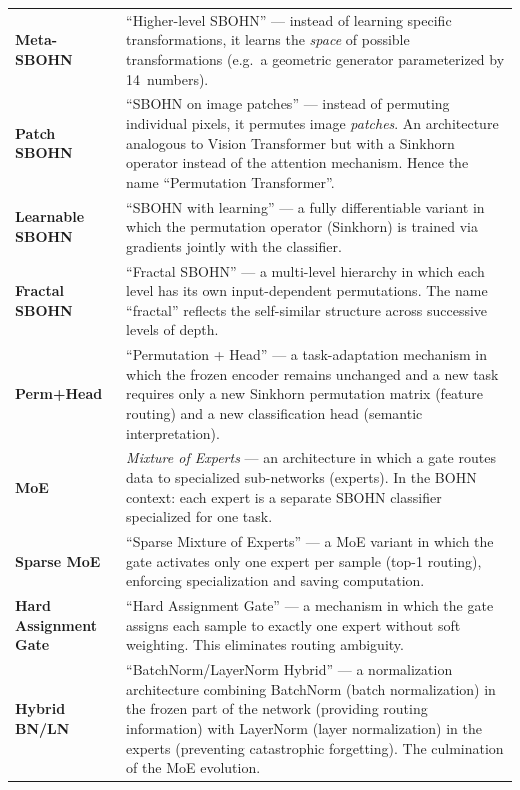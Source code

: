 \documentclass[11pt,a4paper]{report}
\begin{document}
\begin{center}
\begin{tabular}{lp{10cm}}
\textbf{Meta-SBOHN} &
``Higher-level SBOHN'' --- instead of learning specific transformations, it learns the \emph{space} of possible transformations (e.g.\ a geometric generator parameterized by 14~numbers). \\

\textbf{Patch SBOHN} &
``SBOHN on image patches'' --- instead of permuting individual pixels, it permutes image \emph{patches}. An architecture analogous to Vision Transformer but with a Sinkhorn operator instead of the attention mechanism. Hence the name ``Permutation Transformer''. \\

\textbf{Learnable SBOHN} &
``SBOHN with learning'' --- a fully differentiable variant in which the permutation operator (Sinkhorn) is trained via gradients jointly with the classifier. \\

\textbf{Fractal SBOHN} &
``Fractal SBOHN'' --- a multi-level hierarchy in which each level has its own input-dependent permutations. The name ``fractal'' reflects the self-similar structure across successive levels of depth. \\

\textbf{Perm+Head} &
``Permutation + Head'' --- a task-adaptation mechanism in which the frozen encoder remains unchanged and a new task requires only a new Sinkhorn permutation matrix (feature routing) and a new classification head (semantic interpretation). \\

\textbf{MoE} &
\emph{Mixture of Experts} --- an architecture in which a gate routes data to specialized sub-networks (experts). In the BOHN context: each expert is a separate SBOHN classifier specialized for one task. \\

\textbf{Sparse MoE} &
``Sparse Mixture of Experts'' --- a MoE variant in which the gate activates only one expert per sample (top-1 routing), enforcing specialization and saving computation. \\

\textbf{Hard Assignment Gate} &
``Hard Assignment Gate'' --- a mechanism in which the gate assigns each sample to exactly one expert without soft weighting. This eliminates routing ambiguity. \\

\textbf{Hybrid BN/LN} &
``BatchNorm/LayerNorm Hybrid'' --- a normalization architecture combining BatchNorm (batch normalization) in the frozen part of the network (providing routing information) with LayerNorm (layer normalization) in the experts (preventing catastrophic forgetting). The culmination of the MoE evolution. \\


\end{tabular}
\end{center}
\end{document}
